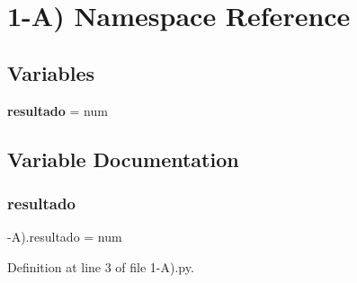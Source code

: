 \section{1-\/A) Namespace Reference}
\label{namespace1-_a_08}
\subsection*{Variables}
\begin{DoxyCompactItemize}
\item 
\textbf{ resultado} = num
\end{DoxyCompactItemize}


\subsection{Variable Documentation}
\mbox{\label{namespace1-_a_08_a4b67196d71d246adaa2f6f65a960fae5}} 
\subsubsection{resultado}
{\footnotesize{}-\/A).resultado = num}



Definition at line 3 of file 1-\/\+A).\+py.

